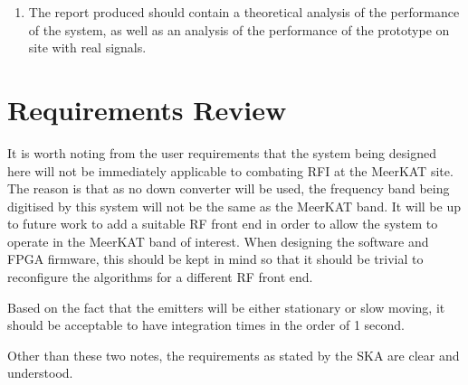 \begin{enumerate}
  \item The report produced should contain a theoretical analysis of the performance of the system, as well as an analysis of the performance of the prototype on site with real signals. 
\end{enumerate}

\section{Requirements Review}
It is worth noting from the user requirements that the system being designed here will not be immediately applicable to combating RFI at the MeerKAT site. The reason is that as no down converter will be used, the frequency band being digitised by this system will not be the same as the MeerKAT band. It will be up to future work to add a suitable RF front end in order to allow the system to operate in the MeerKAT band of interest. When designing the software and FPGA firmware, this should be kept in mind so that it should be trivial to reconfigure the algorithms for a different RF front end. 

Based on the fact that the emitters will be either stationary or slow moving, it should be acceptable to have integration times in the order of 1 second. 

Other than these two notes, the requirements as stated by the SKA are clear and understood.


